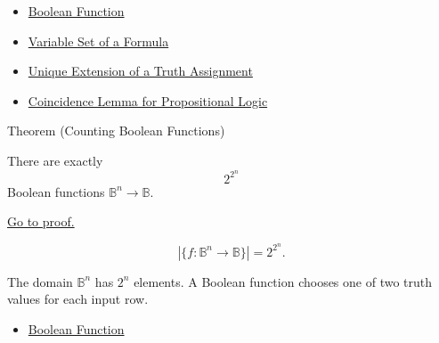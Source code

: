 \begin{dependencies}
\begin{itemize}
  \item \hyperref[def:boolean-function-propositional-logic]{Boolean Function}
  \item \hyperref[def:formula-variable-set-propositional-logic]{Variable Set of a Formula}
  \item \hyperref[thm:unique-extension-truth-assignment-propositional-logic]{Unique Extension of a Truth Assignment}
  \item \hyperref[lem:coincidence-lemma-propositional-logic]{Coincidence Lemma for Propositional Logic}
\end{itemize}
\end{dependencies}
\begin{theorembox}{Theorem (Counting Boolean Functions)}
\begin{theorem}
\label{thm:counting-boolean-functions}
There are exactly
\[
2^{2^n}
\]
Boolean functions \(\mathbb{B}^n\to\mathbb{B}\).

\noindent\hyperref[prf:counting-boolean-functions]{Go to proof.}
\end{theorem}
\end{theorembox}

\begin{remark*}
\[
\left|\{f:\mathbb{B}^n\to\mathbb{B}\}\right|=2^{2^n}.
\]
\end{remark*}

\begin{remark*}[Interpretation]
The domain \(\mathbb{B}^n\) has \(2^n\) elements. A Boolean function chooses one of two truth values for each input row.
\end{remark*}

\begin{dependencies}
\begin{itemize}
  \item \hyperref[def:boolean-function-propositional-logic]{Boolean Function}
\end{itemize}
\end{dependencies}
